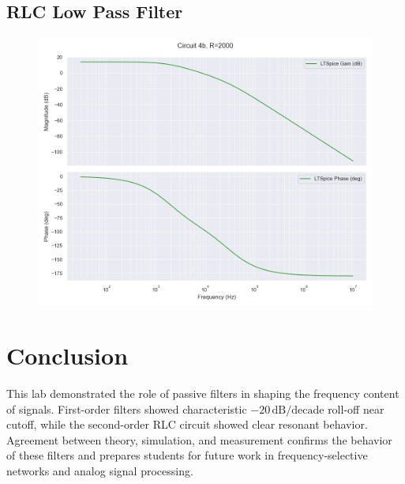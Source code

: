 \documentclass[12pt]{article}
\begin{document}
\subsection{RLC Low Pass Filter}
\begin{figure}[H]
	\includegraphics[width=\textwidth]{e6_bode5}
\end{figure}
\section{Conclusion}
This lab demonstrated the role of passive filters in shaping the frequency content of signals. First-order filters showed characteristic $-20\,\mathrm{dB/decade}$ roll-off near cutoff, while the second-order RLC circuit showed clear resonant behavior. Agreement between theory, simulation, and measurement confirms the behavior of these filters and prepares students for future work in frequency-selective networks and analog signal processing.
\end{document}
